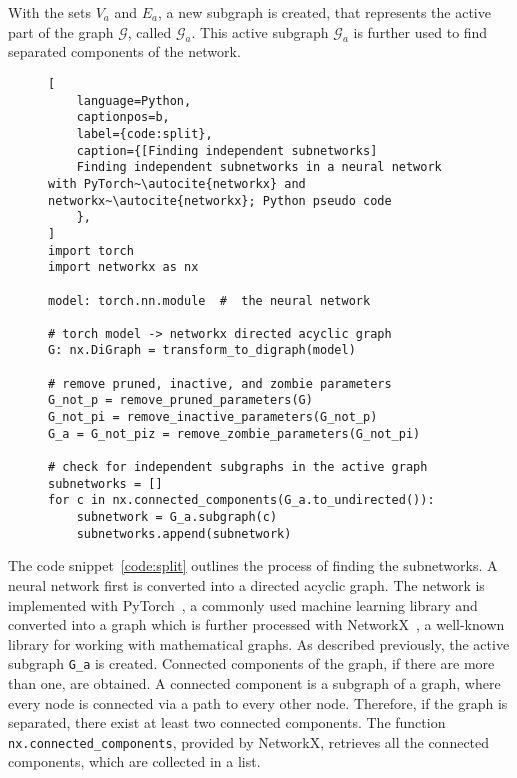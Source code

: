 With the sets $V_a$ and $E_a$, a new subgraph is created, that represents the active part of the graph $\mathcal{G}$, called $\mathcal{G}_a$.
This active subgraph $\mathcal{G}_a$ is further used to find separated components of the network.

\begin{figure}[ht] %
\centering
\begin{minipage}{\linewidth}
\begin{lstlisting}[
    language=Python,
    captionpos=b, 
    label={code:split},
    caption={[Finding independent subnetworks]
    Finding independent subnetworks in a neural network with PyTorch~\autocite{networkx} and networkx~\autocite{networkx}; Python pseudo code
    },
]
import torch
import networkx as nx

model: torch.nn.module  #  the neural network

# torch model -> networkx directed acyclic graph
G: nx.DiGraph = transform_to_digraph(model)

# remove pruned, inactive, and zombie parameters
G_not_p = remove_pruned_parameters(G)
G_not_pi = remove_inactive_parameters(G_not_p)
G_a = G_not_piz = remove_zombie_parameters(G_not_pi)

# check for independent subgraphs in the active graph
subnetworks = []
for c in nx.connected_components(G_a.to_undirected()):
    subnetwork = G_a.subgraph(c)
    subnetworks.append(subnetwork)
\end{lstlisting}
\end{minipage}
\end{figure}

The code snippet~\ref{code:split} outlines the process of finding the subnetworks.
A neural network first is converted into a directed acyclic graph.
The network is implemented with PyTorch~\autocite{pytorch}, a commonly used machine learning library and converted into a graph which is further processed with NetworkX~\autocite{networkx}, a well-known library for working with mathematical graphs.
As described previously, the active subgraph \lstinline{G_a} is created.
Connected components of the graph, if there are more than one, are obtained.
A connected component is a subgraph of a graph, where every node is connected via a path to every other node.
Therefore, if the graph is separated, there exist at least two connected components.
The function \lstinline{nx.connected_components}, provided by NetworkX, retrieves all the connected components, which are collected in a list.

